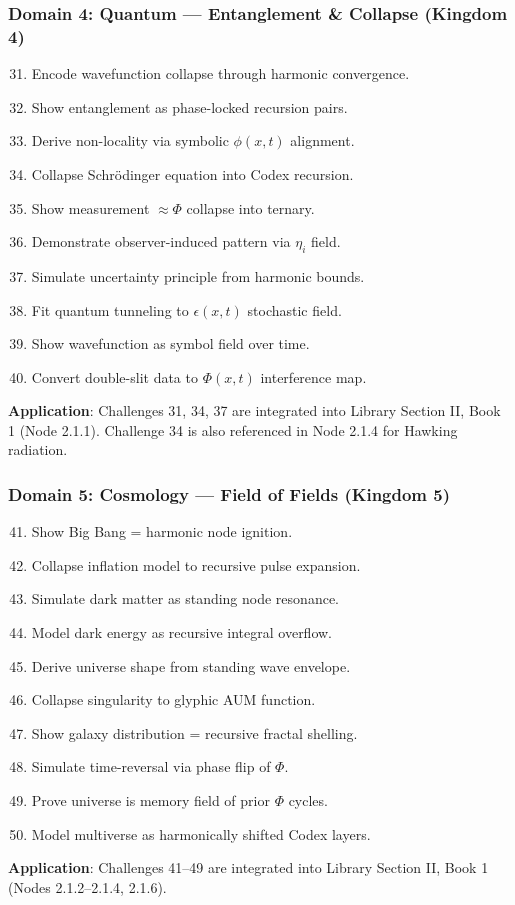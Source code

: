 \subsubsection{Domain 4: Quantum — Entanglement \& Collapse (Kingdom 4)}
\begin{enumerate}
    \setcounter{enumi}{30}
    \item Encode wavefunction collapse through harmonic convergence.
    \item Show entanglement as phase-locked recursion pairs.
    \item Derive non-locality via symbolic \(\phi(x,t)\) alignment.
    \item Collapse Schrödinger equation into Codex recursion.
    \item Show measurement \(\approx \Phi\) collapse into ternary.
    \item Demonstrate observer-induced pattern via \(\eta_i\) field.
    \item Simulate uncertainty principle from harmonic bounds.
    \item Fit quantum tunneling to \(\epsilon(x,t)\) stochastic field.
    \item Show wavefunction as symbol field over time.
    \item Convert double-slit data to \(\Phi(x,t)\) interference map.
\end{enumerate}
\textbf{Application}: Challenges 31, 34, 37 are integrated into Library Section II, Book 1 (Node 2.1.1). Challenge 34 is also referenced in Node 2.1.4 for Hawking radiation.

\subsubsection{Domain 5: Cosmology — Field of Fields (Kingdom 5)}
\begin{enumerate}
    \setcounter{enumi}{40}
    \item Show Big Bang = harmonic node ignition.
    \item Collapse inflation model to recursive pulse expansion.
    \item Simulate dark matter as standing node resonance.
    \item Model dark energy as recursive integral overflow.
    \item Derive universe shape from standing wave envelope.
    \item Collapse singularity to glyphic AUM function.
    \item Show galaxy distribution = recursive fractal shelling.
    \item Simulate time-reversal via phase flip of \(\Phi\).
    \item Prove universe is memory field of prior \(\Phi\) cycles.
    \item Model multiverse as harmonically shifted Codex layers.
\end{enumerate}
\textbf{Application}: Challenges 41–49 are integrated into Library Section II, Book 1 (Nodes 2.1.2–2.1.4, 2.1.6).

